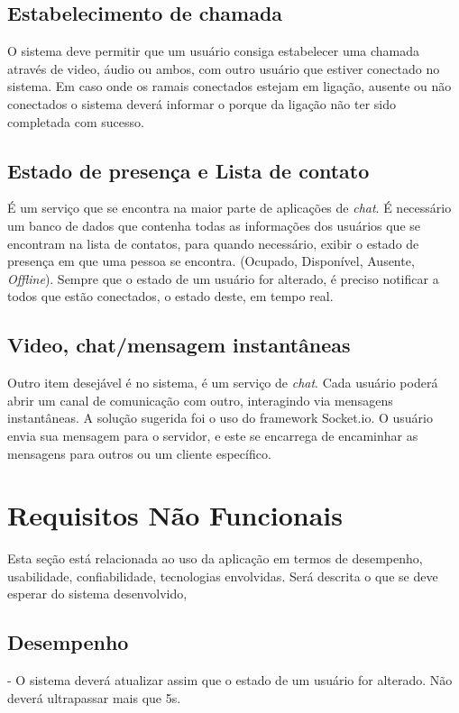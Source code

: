 \documentclass[ruledheader]{abnt} %
\begin{document}
\subsection{Estabelecimento de chamada}
\label{ss_estabelecimentoDechamada}
O sistema deve permitir que um usuário consiga estabelecer uma chamada através de video, áudio ou ambos, com outro usuário que estiver conectado no sistema. Em caso onde os ramais conectados estejam em ligação, ausente ou não conectados o sistema deverá informar o porque da ligação não ter sido completada com sucesso.

\subsection{Estado de presença e Lista de contato}
\label{ss_estadoElistaDeContato}
É um serviço que se encontra na maior parte de aplicações de \textit{chat}. É necessário um banco de dados que contenha todas as informações dos usuários que se encontram na lista de contatos, para quando necessário, exibir o estado de presença em que uma pessoa se encontra. (Ocupado, Disponível, Ausente, \textit{Offline}). Sempre que o estado de um usuário for alterado, é preciso notificar a todos que estão conectados, o estado deste, em tempo real.

\subsection{Video, chat/mensagem instantâneas}
\label{ss_videoEchat}
Outro item desejável é no sistema, é um serviço de \textit{chat}. Cada usuário poderá abrir um canal de comunicação com outro, interagindo via mensagens instantâneas. 
A solução sugerida foi o uso do framework Socket.io. O usuário envia sua mensagem para o servidor, e este se encarrega de encaminhar as mensagens para outros ou um cliente específico.

\section{Requisitos Não Funcionais}
\label{s_requisitosNaoFuncionais}
Esta seção está relacionada ao uso da aplicação em termos de desempenho, usabilidade, confiabilidade, tecnologias envolvidas. Será descrita o que se deve esperar do sistema desenvolvido, 

\subsection{Desempenho}
\label{ss_desempenho}
 - O sistema deverá atualizar assim que o estado de um usuário for alterado. Não deverá ultrapassar mais que 5s.
\end{document}
